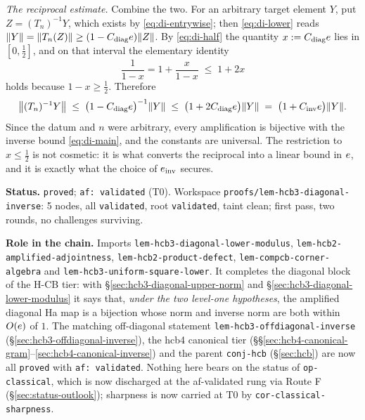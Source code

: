 \emph{The reciprocal estimate.} Combine the two. For an arbitrary target element $Y$, put
$Z=(T_n)^{-1}Y$, which exists by \eqref{eq:di-entrywise}; then \eqref{eq:di-lower} reads
$\lVert Y\rVert=\lVert T_n(Z)\rVert\ge(1-C_{\mathrm{diag}}e)\lVert Z\rVert$. By \eqref{eq:di-half} the
quantity $x:=C_{\mathrm{diag}}e$ lies in $[0,\tfrac12]$, and on that interval the
elementary identity
\[
  \frac1{1-x}=1+\frac{x}{1-x}\;\le\;1+2x
\]
holds because $1-x\ge\tfrac12$. Therefore
\[
  \bigl\lVert(T_n)^{-1}Y\bigr\rVert
  \;\le\;\bigl(1-C_{\mathrm{diag}}e\bigr)^{-1}\lVert Y\rVert
  \;\le\;\bigl(1+2C_{\mathrm{diag}}e\bigr)\lVert Y\rVert
  \;=\;\bigl(1+C_{\mathrm{inv}}e\bigr)\lVert Y\rVert.
\]
Since the datum and $n$ were arbitrary, every amplification is bijective with the inverse
bound \eqref{eq:di-main}, and the constants are universal. The restriction to
$x\le\tfrac12$ is not cosmetic: it is what converts the reciprocal into a linear bound in
$e$, and it is exactly what the choice of $e_{\mathrm{inv}}$ secures.

\medskip
\noindent\textbf{Status.} \texttt{proved}; \texttt{af: validated} (T0). Workspace
\texttt{proofs/lem-hcb3-diagonal-inverse}: 5 nodes, all \texttt{validated}, root
\texttt{validated}, taint clean; first pass, two rounds, no challenges surviving.

\noindent\textbf{Role in the chain.} Imports
\texttt{lem-hcb3-diagonal-lower-modulus},
\texttt{lem-hcb2-amplified-adjointness},
\texttt{lem-hcb2-product-defect},
\texttt{lem-compcb-corner-algebra} and
\texttt{lem-hcb3-uniform-square-lower}. It completes the diagonal block of the H-CB tier:
with \S\ref{sec:hcb3-diagonal-upper-norm} and \S\ref{sec:hcb3-diagonal-lower-modulus} it
says that, \emph{under the two level-one hypotheses}, the amplified diagonal Ha map is a
bijection whose norm and inverse norm are both within $O(e)$ of $1$. The matching
off-diagonal statement \texttt{lem-hcb3-offdiagonal-inverse}
(\S\ref{sec:hcb3-offdiagonal-inverse}), the hcb4 canonical tier
(\S\S\ref{sec:hcb4-canonical-gram}--\ref{sec:hcb4-canonical-inverse}) and the parent
\texttt{conj-hcb} (\S\ref{sec:hcb}) are now all \texttt{proved} with
\texttt{af: validated}. Nothing here bears on the status of \texttt{op-classical}, which is now discharged at the af-validated rung via Route F (\S\ref{sec:status-outlook}); sharpness is now carried at T0 by \texttt{cor-classical-sharpness}.
